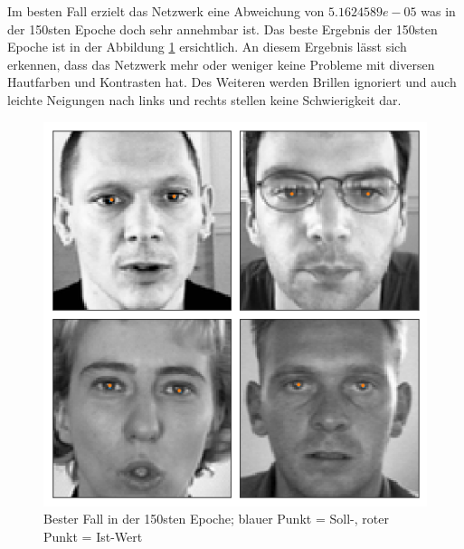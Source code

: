 \noindent
Im besten Fall erzielt das Netzwerk eine Abweichung von $5.1624589e-05$ was in der 150sten Epoche doch sehr annehmbar ist. 
Das beste Ergebnis der 150sten Epoche ist in der Abbildung \ref{fig:good} ersichtlich. 
An diesem Ergebnis lässt sich erkennen, dass das Netzwerk mehr oder weniger keine Probleme mit diversen Hautfarben und Kontrasten hat. 
Des Weiteren werden Brillen ignoriert und auch leichte Neigungen nach links und rechts stellen keine Schwierigkeit dar. 
\begin{figure}[ht!]
	\centering
	\includegraphics[scale=0.6]{images/Good_2.png}
	\caption{Bester Fall in der 150sten Epoche; blauer Punkt = Soll-, roter Punkt = Ist-Wert}
	\label{fig:good}
\end{figure} \phantom \newline

